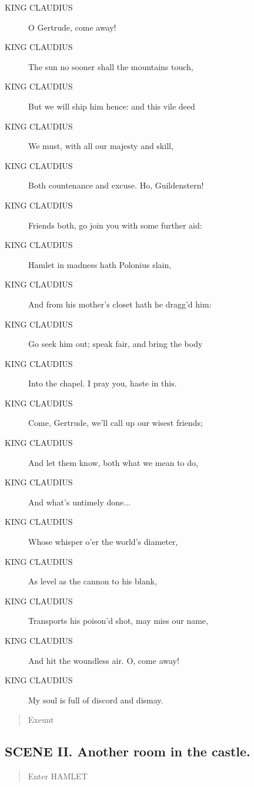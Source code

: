 \documentclass{article}
\begin{document}
\begin{description}
            
\item[KING CLAUDIUS] O Gertrude, come away!
\item[KING CLAUDIUS] The sun no sooner shall the mountains touch,
\item[KING CLAUDIUS] But we will ship him hence: and this vile deed
\item[KING CLAUDIUS] We must, with all our majesty and skill,
\item[KING CLAUDIUS] Both countenance and excuse. Ho, Guildenstern!
\item[KING CLAUDIUS] Friends both, go join you with some further aid:
\item[KING CLAUDIUS] Hamlet in madness hath Polonius slain,
\item[KING CLAUDIUS] And from his mother's closet hath he dragg'd him:
\item[KING CLAUDIUS] Go seek him out; speak fair, and bring the body
\item[KING CLAUDIUS] Into the chapel. I pray you, haste in this.
\item[KING CLAUDIUS] Come, Gertrude, we'll call up our wisest friends;
\item[KING CLAUDIUS] And let them know, both what we mean to do,
\item[KING CLAUDIUS] And what's untimely done...
\item[KING CLAUDIUS] Whose whisper o'er the world's diameter,
\item[KING CLAUDIUS] As level as the cannon to his blank,
\item[KING CLAUDIUS] Transports his poison'd shot, may miss our name,
\item[KING CLAUDIUS] And hit the woundless air. O, come away!
\item[KING CLAUDIUS] My soul is full of discord and dismay.
\end{description}
          
\begin{quote}
Exeunt
\end{quote}
          
\subsection{SCENE II.  Another room in the castle.}
          
\begin{quote}
Enter HAMLET
\end{quote}
          
\end{document}
